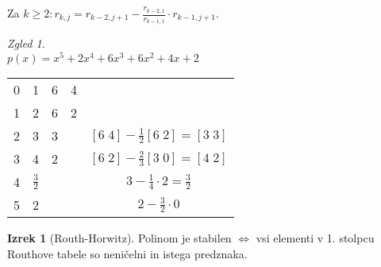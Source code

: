 \documentclass[a4paper, 12pt]{book}
\theoremstyle{definition}
\newtheorem{theorem}[counter]{Izrek}
\theoremstyle{remark}
\newtheorem*{exmp}{Zgled}
\begin{document}
Za $k \geq 2: r_{k,j} = r_{k-2,j+1} - \frac{r_{k-2,1}}{r_{k-1,1}} \cdot r_{k-1,j+1}$.
\begin{exmp} \text{} \\
  $p(x) = x^5 + 2x^4 + 6x^3 + 6x^2 + 4x + 2$
  \begin{center}
      \begin{tabular}{c | c c c c}
          & & & & \\
          \hline
          0 & 1 & 6 & 4 & \\
          1 & 2 & 6 & 2 & \\
          2 & 3 & 3 & & $[6 \; 4] - \frac{1}{2} [6 \; 2] = [3 \; 3]$ \\
          3 & 4 & 2 & & $[6 \; 2] - \frac{2}{3} [3 \; 0] = [4 \; 2]$ \\
          4 & $\frac{3}{2}$ & & & $3 - \frac{1}{4} \cdot 2 = \frac{3}{2}$ \\
          5 & 2 & & & $2 - \frac{3}{2} \cdot 0$
      \end{tabular}
  \end{center}
\end{exmp}
\begin{theorem}[Routh-Horwitz]
  Polinom  je stabilen $\iff$
  vsi elementi v 1. stolpcu Routhove tabele so neničelni in istega predznaka.
\end{theorem}



\end{document}
